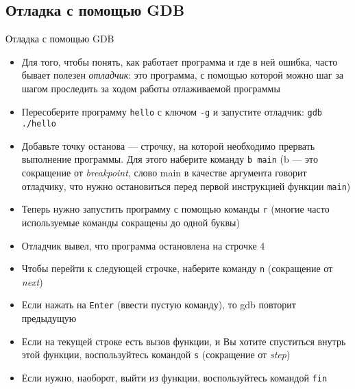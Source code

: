 \documentclass[handout]{beamer}
\begin{document}
\subsection{Отладка с помощью GDB}
\begin{frame}{Отладка с помощью GDB}
	\begin{itemize}
		\item{Для того, чтобы понять, как работает программа и где в ней ошибка, часто бывает полезен \emph{отладчик}: это программа, с помощью которой можно шаг за шагом проследить за ходом работы отлаживаемой программы}\pause
		\item{Пересоберите программу \texttt{hello} с ключом \texttt{-g} и запустите отладчик: \texttt{gdb ./hello}}\pause
		\item{Добавьте точку останова --- строчку, на которой необходимо прервать выполнение программы. Для этого наберите команду \texttt{b main} (b --- это сокращение от \emph{breakpoint}, слово main в качестве аргумента говорит отладчику, что нужно остановиться перед первой инструкцией функции \texttt{main})}
	\end{itemize}
\end{frame}

\begin{frame}
	\begin{itemize}
		\item{Теперь нужно запустить программу с помощью команды \texttt{r} (многие часто используемые команды сокращены до одной буквы)}\pause
		\item{Отладчик вывел, что программа остановлена на строчке 4}\pause
		\item{Чтобы перейти к следующей строчке, наберите команду \texttt{n} (сокращение от \emph{next})}\pause
		\item{Если нажать на \texttt{Enter} (ввести пустую команду), то gdb повторит предыдущую}\pause
		\item{Если на текущей строке есть вызов функции, и Вы хотите спуститься внутрь этой функции, воспользуйтесь командой \texttt{s} (сокращение от \emph{step})}\pause
		\item{Если нужно, наоборот, выйти из функции, воспользуйтесь командой \texttt{fin}}
	\end{itemize}
\end{frame}
\end{document}
